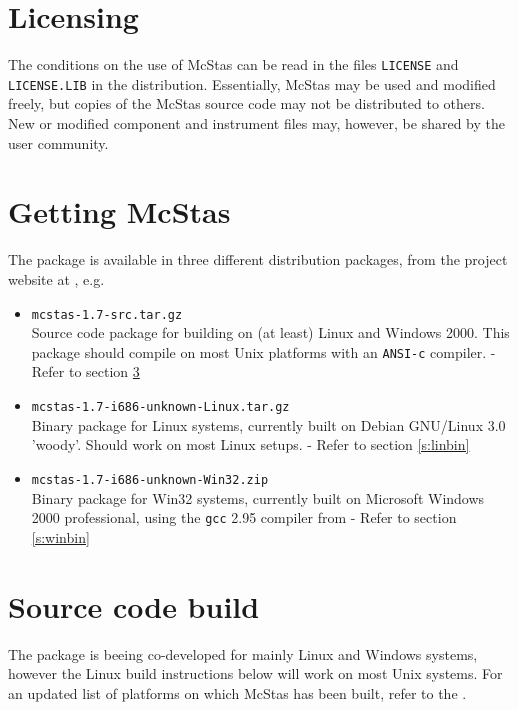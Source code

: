 \label{s:install}
\section{Licensing}
The conditions on the use of McStas can be read in the files
\verb+LICENSE+ and \verb+LICENSE.LIB+ in the distribution. Essentially,
McStas may be used and modified freely, but copies of the McStas source code 
may not be distributed to others. 
New or modified component and instrument files may, however, be shared by 
the user community.

\section{Getting McStas}
\label{s:obtain}
The  package is
available in three different distribution packages, from the project
website at
, e.g.
\begin{itemize}
\item{\texttt{mcstas-1.7-src.tar.gz}\\Source code package for
    building  on
    (at least) Linux and Windows 2000. This package should compile on
    most Unix platforms with an \texttt{ANSI-c} compiler. - Refer to section \ref{s:src}}
\item{\texttt{mcstas-1.7-i686-unknown-Linux.tar.gz}\\Binary package
  for Linux systems, currently built on Debian GNU/Linux 3.0 'woody'. 
  Should work on most Linux setups.
 - Refer to section \ref{s:linbin}}
\item{\texttt{mcstas-1.7-i686-unknown-Win32.zip}\\Binary package
  for Win32 systems, currently built on Microsoft Windows 2000
  professional, using the \texttt{gcc} 2.95 compiler from 
   - Refer to section \ref{s:winbin}}
\end{itemize}

\section{Source code build}
\label{s:src}
The  package is
beeing co-developed for mainly Linux and Windows systems, however 
the Linux build instructions below will work on most Unix
systems. For an updated list of platforms on which McStas has been
built, refer to the .

